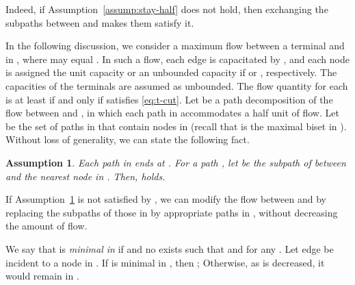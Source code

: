 \documentclass{article}
\newtheorem{assumption}{Assumption}
\begin{document}
Indeed, if Assumption~\ref{assump:stay-half} does not hold, then 
exchanging the subpaths between  and  makes them satisfy it.

In the following discussion, we consider a maximum flow between a terminal  and  in , where
 may equal . In such a flow, each edge  is capacitated by , and each node 
is assigned the unit capacity or an unbounded capacity if  or , respectively. The capacities of the
terminals are assumed as unbounded. The flow quantity for each  is at least  if and only if 
satisfies \eqref{eq:t-cut}. Let  be a path decomposition of the
flow between  and , in which each path in 
accommodates a half unit of flow. Let  be the set of paths in  that contain nodes in 
(recall that  is the maximal biset in ). Without loss of generality, we can state the
following fact.

\begin{assumption}\label{assump:path-decomposition}
 Each path in  ends at .
 For a path , let  be the subpath of  between  and the nearest node in
 . 
 Then,  holds.
\end{assumption}

If Assumption~\ref{assump:path-decomposition} is 
not satisfied by , we can modify the flow between 
and 
by replacing the subpaths of those in
 by appropriate paths in , without decreasing the amount of flow.


We say that  is \emph{minimal in }
if  and
no 
exists such that  and  for any .
Let edge  be incident to a node in .
If  is minimal in ,
then ;
Otherwise,
as  is decreased, it would remain in .
\end{document}
